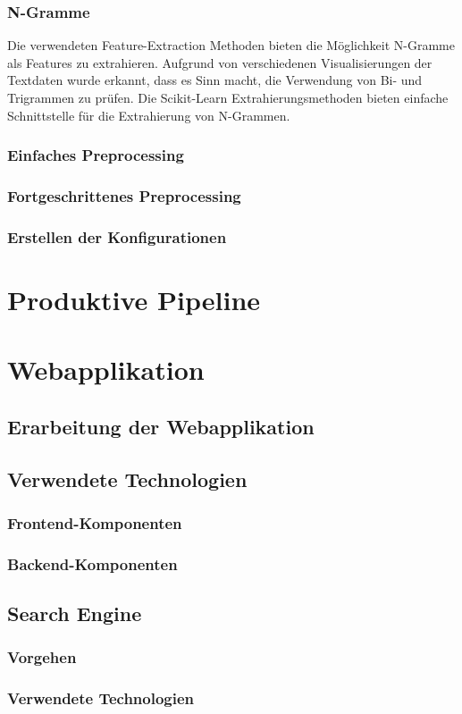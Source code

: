 \subsubsection{N-Gramme}
Die verwendeten Feature-Extraction Methoden bieten die Möglichkeit N-Gramme als Features zu extrahieren.
Aufgrund von verschiedenen Visualisierungen der Textdaten wurde erkannt, dass es Sinn macht, die Verwendung von Bi- und Trigrammen zu prüfen.
Die Scikit-Learn Extrahierungsmethoden bieten einfache Schnittstelle für die Extrahierung von N-Grammen.
\subsubsection{Einfaches Preprocessing}
\subsubsection{Fortgeschrittenes Preprocessing}

\subsubsection{Erstellen der Konfigurationen}
\section{Produktive Pipeline}
\section{Webapplikation}
\subsection{Erarbeitung der Webapplikation}
\subsection{Verwendete Technologien}
\subsubsection{Frontend-Komponenten}
\subsubsection{Backend-Komponenten}
\subsection{Search Engine}
\subsubsection{Vorgehen}
\subsubsection{Verwendete Technologien}